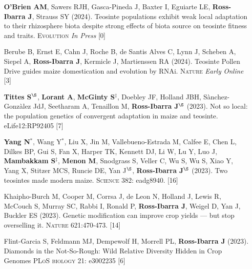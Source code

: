 \documentclass[letterpaper,10pt]{article}
\begin{document}
\begin{etaremune}
\setlength\itemsep{0ex}

\item \textbf{O'Brien AM},  Sawers RJH, Gasca-Pineda J, Baxter I, Eguiarte LE, \textbf{Ross-Ibarra J}, Strauss SY (2024).  Teosinte populations exhibit weak local adaptation to their rhizosphere biota despite strong effects of biota source on teosinte fitness and traits. \textsc{Evolution} \textit{In Press}  
 [0]\\

\item Berube B, Ernst E, Cahn J, Roche B, de Santis Alves C, Lynn J, Scheben A, Siepel A, \textbf{Ross-Ibarra J}, Kermicle J, Martienssen RA (2024). Teosinte Pollen Drive guides maize domestication and evolution by RNAi. \textsc{Nature} \textit{Early Online}
 [3]\\

\item \textbf{Tittes S}$^\S$, \textbf{Lorant A}, \textbf{McGinty S}$^\ddagger$, Doebley JF,  Holland JBH, S\`{a}nchez-Gonz\`{a}lez JdJ, Seetharam A, Tenaillon M, \textbf{Ross-Ibarra J}$^\S$ (2023). Not so local: the population genetics of convergent adaptation in maize and teosinte. eLife12:RP92405 %
 [7]\\

\item \textbf{Yang N}$^*$, Wang Y$^*$,  Liu X, Jin M, Vallebueno-Estrada M, Calfee E, Chen L, Dilkes BP, Gui S, Fan X, Harper TK, Kennett DJ, Li W, Lu Y, Luo J, \textbf{Mambakkam S}$^\ddagger$, \textbf{Menon M}, Snodgrass S, Veller C, Wu S, Wu S, Xiao Y, Yang X, Stitzer MCS, Runcie DE, Yan J$^\S$, \textbf{Ross-Ibarra J}$^\S$ (2023). Two teosintes made modern maize. \textsc{Science} 382: eadg8940.
 [16]\\

\item Khaipho-Burch M, Cooper M, Corrsa J, de Leon N, Holland J, Lewis R, McCouch S, Murray SC, Rabbi I, Ronald P, \textbf{Ross-Ibarra J}, Weigel D, Yan J, Buckler ES (2023). Genetic modification can improve crop yields --- but stop overselling it. \textsc{Nature} 621:470-473.
 [14]\\

\item Flint-Garcia S,  Feldmann MJ, Dempewolf H,  Morrell PL, \textbf{Ross-Ibarra J} (2023). Diamonds in the Not-So-Rough: Wild Relative Diversity Hidden in Crop Genomes \textsc{PLoS biology} 21: e3002235	
 [6]\\


\end{etaremune}
\end{document}
